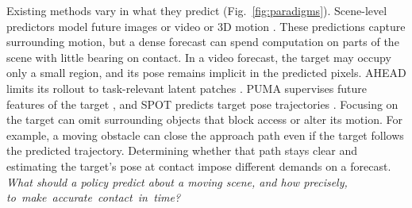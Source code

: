
Existing methods vary in what they predict (Fig.~\ref{fig:paradigms}).
Scene-level predictors model future images or video \cite{dbctfp,dreamzero,openwam_alpha,dynamicwam}
or 3D motion \cite{physmani}. These predictions capture surrounding motion, but a dense forecast can spend computation on parts of the scene with little bearing
on contact. In a video forecast, the target may occupy only a small region, and its pose remains implicit in the predicted pixels. AHEAD limits its rollout to task-relevant
latent patches \cite{ahead}. PUMA supervises future features of the target \cite{domino}, and SPOT predicts target pose trajectories \cite{spot}. Focusing on the target can omit surrounding objects that block access or alter its motion. For example, a
moving obstacle can close the approach path even if the target follows the
predicted trajectory. Determining whether that path stays clear and estimating
the target's pose at contact impose different demands on a forecast.
\emph{What should a policy predict about a moving scene, and how precisely,
\mbox{to make accurate contact in time?}}





